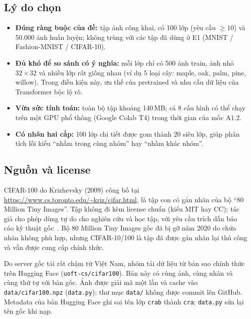 \documentclass[12pt]{article}
\newcommand{\code}[1]{\texttt{#1}}
\newcommand{\st}[1]{\textbf{#1}}
\begin{document}
\subsection{Lý do chọn}
\begin{itemize}
  \item \st{Đúng ràng buộc của đề:} tập ảnh công khai, có 100 lớp (yêu cầu $\geq 10$) và 50.000 ảnh huấn luyện;
        không trùng với các tập đã dùng ở E1 (MNIST / Fashion-MNIST / CIFAR-10).
  \item \st{Đủ khó để so sánh có ý nghĩa:} mỗi lớp chỉ có 500 ảnh train, ảnh nhỏ $32\times32$ và nhiều lớp rất giống
        nhau (ví dụ 5 loại cây: maple, oak, palm, pine, willow). Trong điều kiện này, ưu thế của pretrained và nhu cầu
        dữ liệu của Transformer bộc lộ rõ.
  \item \st{Vừa sức tính toán:} toàn bộ tập khoảng 140\,MB; cả 8 cấu hình có thể chạy trên một GPU phổ thông
        (Google Colab T4) trong thời gian của mốc A1.2.
  \item \st{Có nhãn hai cấp:} 100 lớp chi tiết được gom thành 20 siêu lớp, giúp phân tích lỗi kiểu
        ``nhầm trong cùng nhóm'' hay ``nhầm khác nhóm''.
\end{itemize}

\subsection{Nguồn và license}
CIFAR-100 do Krizhevsky (2009) công bố tại \url{https://www.cs.toronto.edu/~kriz/cifar.html}, là tập con có gán nhãn
của bộ ``80 Million Tiny Images''. Tập không đi kèm license chuẩn (kiểu MIT hay CC); tác giả cho phép dùng tự do cho
nghiên cứu và học tập, với yêu cầu trích dẫn báo cáo kỹ thuật gốc~\cite{krizhevsky2009}. Bộ 80 Million Tiny Images
gốc đã bị gỡ năm 2020 do chứa nhãn không phù hợp, nhưng CIFAR-10/100 là tập đã được gán nhãn lại thủ công và vẫn được
cung cấp chính thức.

Do server gốc tải rất chậm từ Việt Nam, nhóm tải dữ liệu từ bản sao chính thức trên Hugging Face
(\code{uoft-cs/cifar100}). Bản này có cùng ảnh, cùng nhãn và cùng thứ tự với bản gốc. Ảnh được giải mã một lần
và cache vào \code{data/cifar100.npz} (\code{data.py}); thư mục \code{data/} không được commit lên GitHub.
Metadata của bản Hugging Face ghi sai tên lớp \code{crab} thành \code{cra}; \code{data.py} sửa lại tên gốc khi nạp.
\end{document}
